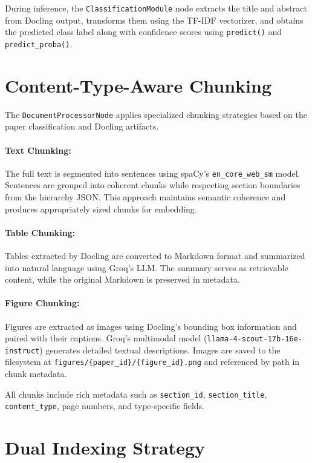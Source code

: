 \documentclass[12pt,a4paper]{report}
\begin{document}
During inference, the \texttt{ClassificationModule} node extracts the title and abstract from Docling output, transforms them using the TF-IDF vectorizer, and obtains the predicted class label along with confidence scores using \texttt{predict()} and \texttt{predict\_proba()}.

\section{Content-Type-Aware Chunking}

The \texttt{DocumentProcessorNode} applies specialized chunking strategies based on the paper classification and Docling artifacts.

\paragraph{Text Chunking:} The full text is segmented into sentences using spaCy’s \texttt{en\_core\_web\_sm} model. Sentences are grouped into coherent chunks while respecting section boundaries from the hierarchy JSON. This approach maintains semantic coherence and produces appropriately sized chunks for embedding.

\paragraph{Table Chunking:} Tables extracted by Docling are converted to Markdown format and summarized into natural language using Groq’s LLM. The summary serves as retrievable content, while the original Markdown is preserved in metadata.

\paragraph{Figure Chunking:} Figures are extracted as images using Docling’s bounding box information and paired with their captions. Groq’s multimodal model (\texttt{llama-4-scout-17b-16e-instruct}) generates detailed textual descriptions. Images are saved to the filesystem at \texttt{figures/\{paper\_id\}/\{figure\_id\}.png} and referenced by path in chunk metadata.

All chunks include rich metadata such as \texttt{section\_id}, \texttt{section\_title}, \texttt{content\_type}, page numbers, and type-specific fields.

\section{Dual Indexing Strategy}
\end{document}
